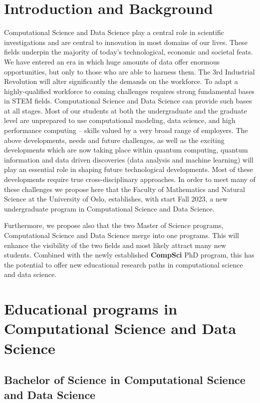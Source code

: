 \documentclass[oneside,final,10pt]{article}
\begin{document}
\section*{Introduction and Background}

Computational Science and Data Science play a central role in scientific investigations and are central to innovation in most domains of our lives. These fields underpin the majority of today's technological, economic and societal feats. We have entered an era in which huge amounts of data offer enormous opportunities, but only to those who are able to harness them. The 3rd Industrial Revolution will alter significantly the demands on the workforce. To adapt a highly-qualified workforce to coming challenges requires strong fundamental bases in STEM fields. Computational Science and Data Science can provide such bases at all stages. Most of our students at both the undergraduate and the graduate level are unprepared to use computational modeling, data science, and high performance computing – skills valued by a very broad range of employers. 
The above developments, needs and future challenges, as well as the exciting developments which are now taking place within quantum computing, quantum information and data driven discoveries (data analysis and machine learning) will play an essential role in shaping future technological developments. Most of these developments require true cross-disciplinary approaches.  In order to meet many of these challenges we propose here that the Faculty of Mathematics and Natural Science at the University of Oslo, establishes, with start Fall 2023, a new undergraduate program in Computational Science and Data Science.

Furthermore, we propose also that the two Master of Science programs, Computational Science and Data Science merge into one programs. This will enhance the visibility of the two fields and most likely attract many new students. Combined with the newly established {\bf CompSci} PhD program, this has the potential to offer new educational research paths in computational science and data science. 


\section*{Educational programs in Computational Science and Data Science}


\subsection*{Bachelor of Science in Computational Science and Data Science}
\end{document}
